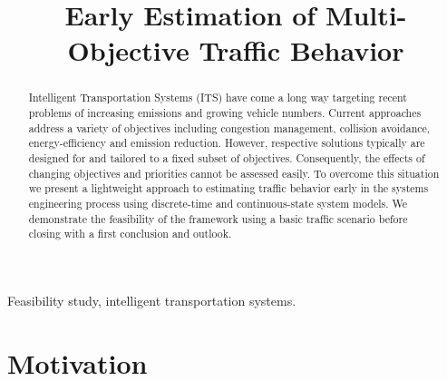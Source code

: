 \documentclass[conference]{../cls/IEEEtran}
\begin{document}
\title{Early Estimation of Multi-Objective Traffic Behavior}

\author{
	\and
}

\maketitle

\begin{abstract}
Intelligent Transportation Systems (ITS) have come a long way targeting recent problems of increasing emissions and growing vehicle numbers. Current approaches address a variety of objectives including congestion management, collision avoidance, energy-efficiency and emission reduction. However, respective solutions typically are designed for and tailored to a fixed subset of objectives. Consequently, the effects of changing objectives and priorities cannot be assessed easily. To overcome this situation we present a lightweight approach to estimating traffic behavior early in the systems engineering process using discrete-time and continuous-state system models. We demonstrate the feasibility of the framework using a basic traffic scenario before closing with a first conclusion and outlook.
\end{abstract}

\begin{IEEEkeywords}
Feasibility study, intelligent transportation systems.
\end{IEEEkeywords}

\section{Motivation}
\label{sec:motivation}
\end{document}
